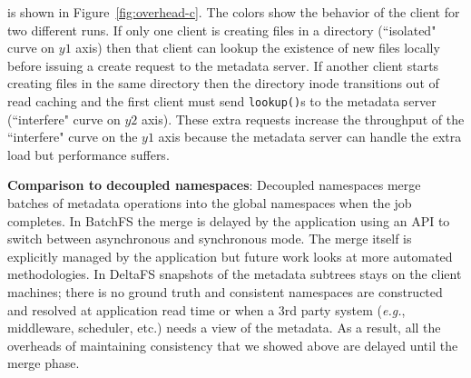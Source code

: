  is shown in
Figure~\ref{fig:overhead-c}. The colors show the behavior of the client for two
different runs.  If only one client is creating files in a directory
(``isolated" curve on \(y1\) axis) then that client can lookup the existence of
new files locally before issuing a create request to the metadata server. If
another client starts creating files in the same directory then the directory
inode transitions out of read caching and the first client must send
\texttt{lookup()}s to the metadata server (``interfere" curve on \(y2\) axis).
These extra requests increase the throughput of the ``interfere" curve on the
\(y1\) axis because the metadata server can handle the extra load but
performance suffers.  




\textbf{Comparison to decoupled namespaces}: Decoupled namespaces
merge batches of metadata operations into the global namespaces when the job
completes.  In BatchFS the merge is delayed by the application using an API to
switch between asynchronous and synchronous mode. The merge itself is explicitly
managed by the application but future work looks at more automated
methodologies. In DeltaFS snapshots of the metadata subtrees stays on the client
machines; there is no ground truth and consistent namespaces are constructed
and resolved at application read time or when a 3rd party system ({\it e.g.},
middleware, scheduler, etc.) needs a view of the metadata. As a result, all the
overheads of maintaining consistency that we showed above are delayed until the
merge phase.
